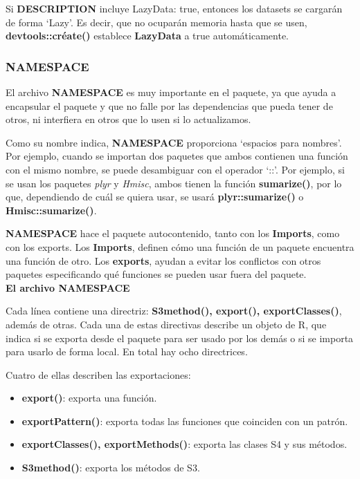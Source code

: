 Si \textbf{DESCRIPTION} incluye LazyData: true, entonces los datasets se cargar\'an de forma
\enquote*{Lazy}. Es decir, que no ocupar\'an memoria hasta que se usen, \textbf{devtools::cr\'eate()} establece
\textbf{LazyData} a true autom\'aticamente.

\subsubsection{NAMESPACE}

El archivo \textbf{NAMESPACE} es muy importante en el paquete, ya que ayuda a encapsular el paquete y que no falle por las dependencias que pueda tener de otros, ni
interfiera en otros que lo usen si lo actualizamos.

Como su nombre indica, \textbf{NAMESPACE} proporciona \enquote*{espacios para nombres}. Por ejemplo,
cuando se importan dos paquetes que ambos contienen una funci\'on con el mismo nombre,
se puede desambiguar con el operador \enquote*{::}. Por ejemplo, si se usan los paquetes \textit{plyr} y
\textit{Hmisc}, ambos tienen la funci\'on \textbf{sumarize()}, por lo que, dependiendo de cu\'al se quiera usar,
se usar\'a \textbf{plyr::sumarize()} o \textbf{Hmisc::sumarize()}.

\textbf{NAMESPACE} hace el paquete autocontenido, tanto con los \textbf{Imports}, como con los
exports. Los \textbf{Imports}, definen c\'omo una funci\'on de un paquete encuentra una funci\'on de
otro. Los \textbf{exports}, ayudan a evitar los conflictos con otros paquetes especificando qu\'e
funciones se pueden usar fuera del paquete.\\

\textbf{El archivo NAMESPACE}

Cada l\'inea contiene una directriz: \textbf{S3method(), export(), exportClasses()}, adem\'as de otras.
Cada una de estas directivas describe un objeto de R, que indica si se exporta desde
el paquete para ser usado por los dem\'as o si se importa para usarlo de forma local.
En total hay ocho directrices. 

Cuatro de ellas describen las exportaciones:

\begin{itemize}
    \item \textbf{ export()}: exporta una funci\'on.
    \item \textbf{ exportPattern()}: exporta todas las funciones que coinciden con un patr\'on.
    \item \textbf{ exportClasses(), exportMethods()}: exporta las clases S4 y sus m\'etodos.
    \item \textbf{ S3method()}: exporta los m\'etodos de S3.
\end{itemize}

